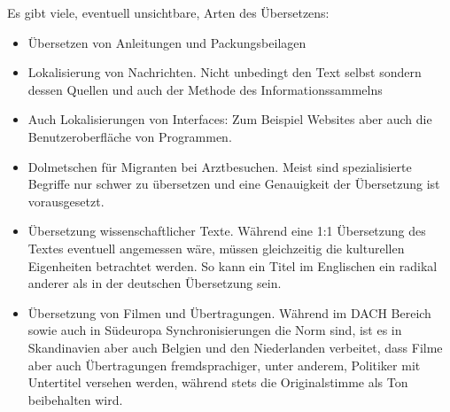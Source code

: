 \documentclass{article}
\begin{document}
	Es gibt viele, eventuell unsichtbare, Arten des Übersetzens:
	\begin{itemize}
		\item{Übersetzen von Anleitungen und Packungsbeilagen}
		\item{Lokalisierung von Nachrichten. Nicht unbedingt den Text selbst sondern dessen Quellen und auch der Methode des Informationssammelns}
		\item{Auch Lokalisierungen von Interfaces: Zum Beispiel Websites aber auch die Benutzeroberfläche von Programmen.}
		\item{Dolmetschen für Migranten bei Arztbesuchen. Meist sind spezialisierte Begriffe nur schwer zu übersetzen und eine Genauigkeit der Übersetzung ist vorausgesetzt.}
		\item{Übersetzung wissenschaftlicher Texte. Während eine 1:1 Übersetzung des Textes eventuell angemessen wäre, müssen gleichzeitig die kulturellen Eigenheiten betrachtet werden. So kann ein Titel im Englischen ein radikal anderer als in der deutschen Übersetzung sein.}
		\item{Übersetzung von Filmen und Übertragungen. Während im DACH Bereich sowie auch in Südeuropa Synchronisierungen die Norm sind, ist es in Skandinavien aber auch Belgien und den Niederlanden verbeitet, dass Filme aber auch Übertragungen fremdsprachiger, unter anderem, Politiker mit Untertitel versehen werden, während stets die Originalstimme als Ton beibehalten wird.}
	\end{itemize}
	
	\newpage
\end{document}
